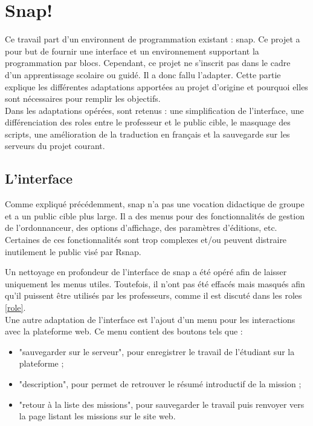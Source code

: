 \section{Snap!}
\label{solution SNAP}
Ce travail part d'un environnent de programmation existant : \gls{snap}. Ce projet a pour but de fournir une interface et un environnement supportant la programmation par \glspl{bloc}. Cependant, ce projet ne s'inscrit pas dans le cadre d'un apprentissage scolaire ou guidé. Il a donc fallu l'adapter. Cette partie explique les différentes adaptations apportées au projet d'origine et pourquoi elles sont nécessaires pour remplir les objectifs.\\

Dans les adaptations opérées, sont retenus : une simplification de l'interface, une différenciation des \glspl{role} entre le professeur et le public cible, le masquage des \glspl{script}, une amélioration de la traduction en français et la sauvegarde sur les serveurs du projet courant.

\subsection{L'interface}
\label{interface}
Comme expliqué précédemment, \gls{snap} n'a pas une vocation didactique de groupe et a un public cible plus large. Il a des menus pour des fonctionnalités de gestion de l'ordonnanceur, des options d'affichage, des paramètres d'éditions, etc. Certaines de ces fonctionnalités sont trop complexes et/ou peuvent distraire inutilement le public visé par \gls{Rsnap}.

Un nettoyage en profondeur de l'interface de \gls{snap} a été opéré afin de laisser uniquement les menus utiles. Toutefois, il n'ont pas été effacés mais masqués afin qu'il puissent être utilisés par les professeurs, comme il est discuté dans les \glspl{role} \ref{role}.\\

Une autre adaptation de l'interface est l'ajout d'un menu pour les interactions avec la plateforme web. Ce menu contient des boutons tels que :
\begin{itemize}
  \item "sauvegarder sur le serveur", pour enregistrer le travail de l'étudiant sur la plateforme ;
  \item "description", pour permet de retrouver le résumé introductif de la mission ;
  \item "retour à la liste des missions", pour sauvegarder le travail puis renvoyer vers la page listant les missions sur le site web.
\end{itemize}

